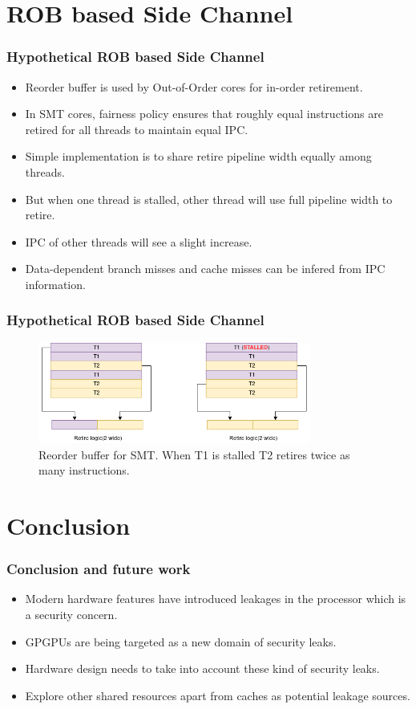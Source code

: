 \documentclass[10pt]{beamer}
\begin{document}
\section{ROB based Side Channel}
\begin{frame}
\frametitle{Hypothetical ROB based Side Channel}
\begin{itemize}
    \item Reorder buffer is used by Out-of-Order cores for in-order retirement.
    \item In SMT cores, fairness policy ensures that roughly equal instructions are retired for all threads to maintain equal IPC.
    \item Simple implementation is to share retire pipeline width equally among threads.
    \item But when one thread is stalled, other thread will use full pipeline width to retire.
    \item IPC of other threads will see a slight increase.
    \item Data-dependent branch misses and cache misses can be infered from IPC information.
\end{itemize}
\end{frame}

\begin{frame}
\frametitle{Hypothetical ROB based Side Channel}
\begin{figure}
\centering
\includegraphics[width=0.8\textwidth]{rob_side_channel}
\caption{Reorder buffer for SMT. When T1 is stalled T2 retires twice as many instructions.}
\end{figure}
\end{frame}

\section{Conclusion}
\begin{frame}
    \frametitle{Conclusion and future work}
\begin{itemize}
\item Modern hardware features have introduced leakages in the processor which is a security concern.
\item GPGPUs are being targeted as a new domain of security leaks.
\item Hardware design needs to take into account these kind of security leaks.
\item Explore other shared resources apart from caches as potential leakage sources.
\end{itemize}
\end{frame}
\end{document}
